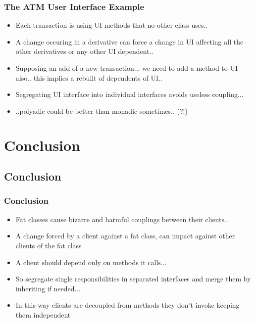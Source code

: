 \documentclass{beamer}
\begin{document}
\begin{frame}
  \frametitle{The ATM User Interface Example}
  \begin{itemize}
	\item<+-> Each transaction is using UI methods that no other class uses..
	\item<+-> A change occuring in a derivative can force a change in UI affecting all the other derivatives or any other UI dependent..
	\item<+-> Supposing an add of a new transaction... we need to add a method to UI also.. this implies a rebuilt of dependents of UI..
	\item<+-> Segregating UI interface into individual interfaces avoids useless coupling...
	\item<+-> ..polyadic could be better than monadic sometimes.. (?!)
   \end{itemize}
\end{frame}

\section{Conclusion}
\subsection{Conclusion}
\begin{frame}
  \frametitle{Conclusion}
  \begin{itemize}
	\item<+-> Fat classes cause bizarre and harmful couplings between their clients..
	\item<+-> A change forced by a client against a fat class, can impact against other clients of the fat class
	\item<+-> A client should depend only on methods it calls...
	\item<+-> So segregate single responsibilities in separated interfaces and merge them by inheriting if needed...
	\item<+-> In this way clients are decoupled from methods they don't invoke keeping them independent
   \end{itemize}
\end{frame}
\end{document}
